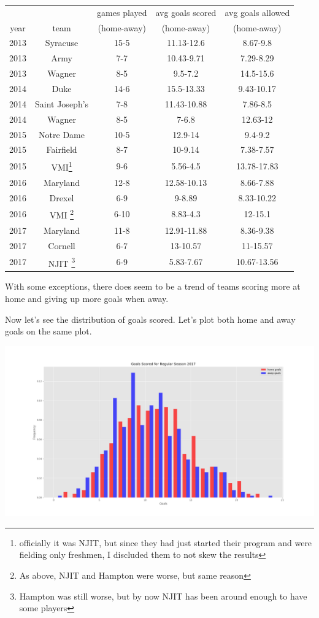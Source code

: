 \documentclass[11pt,a4paper]{article}
\begin{document}
\begin{tabular}{| c || c | c | c | c |}
	\hline
	 & & games played & avg goals scored & avg goals allowed \\ 
	year & team & (home-away) & (home-away) & (home-away) \\\hline \hline
	2013 & Syracuse & 15-5 & 11.13-12.6 & 8.67-9.8 \\ \hline
	2013 & Army & 7-7 & 10.43-9.71 & 7.29-8.29 \\ \hline
	2013 & Wagner & 8-5 & 9.5-7.2 & 14.5-15.6 \\ \hline \hline
	2014 & Duke & 14-6 & 15.5-13.33 & 9.43-10.17 \\ \hline
	2014 & Saint Joseph's & 7-8 & 11.43-10.88 & 7.86-8.5 \\ \hline
	2014 & Wagner & 8-5 & 7-6.8 & 12.63-12 \\ \hline \hline
	2015 & Notre Dame & 10-5 & 12.9-14 & 9.4-9.2 \\ \hline
	2015 & Fairfield & 8-7 & 10-9.14 & 7.38-7.57 \\ \hline
	2015 & VMI\footnote{officially it was NJIT, but since they had just started their program and were fielding only freshmen, I discluded them to not skew the results} & 9-6 & 5.56-4.5 & 13.78-17.83 \\ \hline \hline
	2016 & Maryland & 12-8 & 12.58-10.13 & 8.66-7.88 \\ \hline
	2016 & Drexel & 6-9 & 9-8.89 & 8.33-10.22 \\ \hline
	2016 & VMI \footnote{As above, NJIT and Hampton were worse, but same reason} & 6-10 & 8.83-4.3 & 12-15.1 \\ \hline \hline
	2017 & Maryland & 11-8 & 12.91-11.88 & 8.36-9.38 \\ \hline
	2017 & Cornell & 6-7 & 13-10.57 & 11-15.57 \\ \hline
	2017 & NJIT \footnote{Hampton was still worse, but by now NJIT has been around enough to have some players} & 6-9 & 5.83-7.67 & 10.67-13.56 \\ \hline 
	\hline
\end{tabular}

\vspace{5mm}

With some exceptions, there does seem to be a trend of teams scoring more at home and giving up more goals when away. 

Now let's see the distribution of goals scored. Let's plot both home and away goals on the same plot.

\includegraphics[width=\textwidth]{goals_2017.png}
\end{document}
